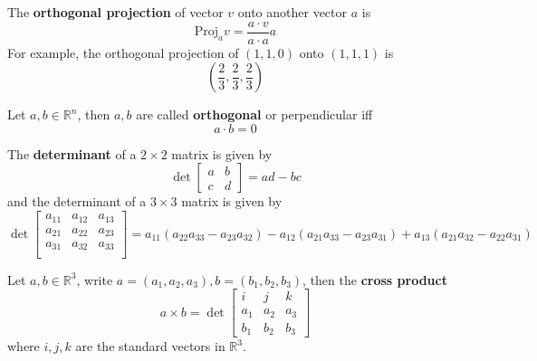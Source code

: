 \documentclass[openany]{book}
\newcommand{\R}{\mathbb{R}}
\begin{document}
\begin{defn}
    The \textbf{orthogonal projection} of vector $v$ onto another vector $a$ is
    \begin{equation*}
        \text{Proj}_av=\frac{a\cdot v}{a\cdot a}a
    \end{equation*}
    For example, the orthogonal projection of $(1,1,0)$ onto $(1,1,1)$ is 
    \begin{equation*}
        \left(\frac{2}{3}, \frac{2}{3},\frac{2}{3}\right)
    \end{equation*}
\end{defn}


\begin{defn}[orthogonal]
    Let $a,b\in\R^n$, then $a,b$ are called \textbf{orthogonal} or perpendicular iff 
    \begin{equation*}
        a\cdot b=0
    \end{equation*}
\end{defn}


\begin{defn}[determinant]
    The \textbf{determinant} of a $2\times 2$ matrix is given by 
    \begin{equation*}
        \det\begin{bmatrix}
            a&b\\
            c&d
        \end{bmatrix}=ad-bc
    \end{equation*}
    and the determinant of a $3\times 3$ matrix is given by 
    \begin{equation*}
        \det\begin{bmatrix}
            a_{11}&a_{12}&a_{13}\\
            a_{21}&a_{22}&a_{23}\\
            a_{31}&a_{32}&a_{33}\\
        \end{bmatrix}=a_{11}(a_{22}a_{33}-a_{23}a_{32})-a_{12}(a_{21}a_{33}-a_{23}a_{31})+a_{13}(a_{21}a_{32}-a_{22}a_{31})
    \end{equation*}
\end{defn}



\begin{defn}
    Let $a,b\in\R^3$, write $a=(a_1,a_2,a_3), b=(b_1,b_2,b_3)$, then the \textbf{cross product}
    \begin{equation*}
        a\times b=\det\begin{bmatrix}
            i&j&k\\
            a_1&a_2&a_3\\
            b_1&b_2&b_3
        \end{bmatrix}
    \end{equation*}
    where $i,j,k$ are the standard vectors in $\R^3$.
\end{defn}
\end{document}
